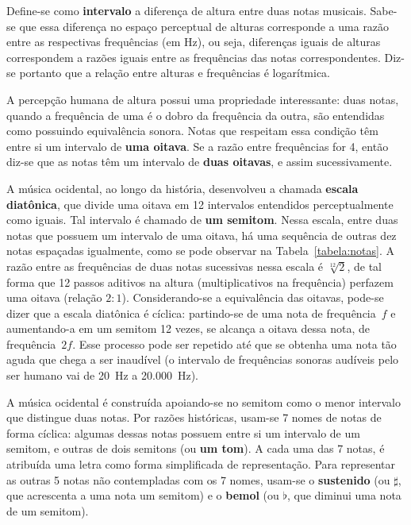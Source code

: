     Define-se como \textbf{intervalo} a diferença de altura entre duas notas musicais. Sabe-se que essa diferença no espaço perceptual de alturas corresponde a uma razão entre as respectivas frequências (em Hz), ou seja, diferenças iguais de alturas correspondem a razões iguais entre as frequências das notas correspondentes. Diz-se portanto que a relação entre alturas e frequências é logarítmica.
    
    A percepção humana de altura possui uma propriedade interessante: duas notas, quando a frequência de uma é o dobro da frequência da outra, são entendidas como possuindo equivalência sonora. Notas que respeitam essa condição têm entre si um intervalo de \textbf{uma oitava}. Se a razão entre frequências for 4, então diz-se que as notas têm um intervalo de \textbf{duas oitavas}, e assim sucessivamente.
    
    A música ocidental, ao longo da história, desenvolveu a chamada \textbf{escala diatônica}, que divide uma oitava em 12 intervalos entendidos perceptualmente como iguais. Tal intervalo é chamado de \textbf{um semitom}. Nessa escala, entre duas notas que possuem um intervalo de uma oitava, há uma sequência de outras dez notas espaçadas igualmente, como se pode observar na Tabela~\ref{tabela:notas}. A razão entre as frequências de duas notas sucessivas nessa escala é $\sqrt[12]{2}$, de tal forma que 12 passos aditivos na altura (multiplicativos na frequência) perfazem uma oitava (relação $2:1$).
    Considerando-se a equivalência das oitavas, pode-se dizer que a escala diatônica é cíclica: partindo-se de uma nota de frequência~$f$ e aumentando-a em um semitom 12 vezes, se alcança a oitava dessa nota, de frequência~$2f$. Esse processo pode ser repetido até que se obtenha uma nota tão aguda que chega a ser inaudível (o intervalo de frequências sonoras audíveis pelo ser humano vai de 20~Hz a 20.000~Hz).

    A música ocidental é construída apoiando-se no semitom como o menor intervalo que distingue duas notas. Por razões históricas, usam-se 7 nomes de notas de forma cíclica: algumas dessas notas possuem entre si um intervalo de um semitom, e outras de dois semitons (ou \textbf{um tom}). 
    A cada uma das 7 notas, é atribuída uma letra como forma simplificada de representação. Para representar as outras 5 notas não contempladas com os 7 nomes, usam-se o \textbf{sustenido} (ou $\sharp$, que acrescenta a uma nota um semitom) e o \textbf{bemol} (ou $\flat$, que diminui uma nota de um semitom).
    
